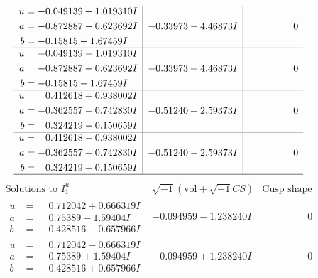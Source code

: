 \documentclass[1p]{elsarticle_modified}
\theoremstyle{definition}
\newcommand{\I}{\sqrt{-1}}
\begin{document}
$$\begin{array}{c|c|c}
\begin{aligned}
u &= -0.049139 + 1.019310 I \\
a &= -0.872887 - 0.623692 I \\
b &= -0.15815 + 1.67459 I\end{aligned}
 & -0.33973 - 4.46873 I & \phantom{-0.000000 } 0 \\ \hline\begin{aligned}
u &= -0.049139 - 1.019310 I \\
a &= -0.872887 + 0.623692 I \\
b &= -0.15815 - 1.67459 I\end{aligned}
 & -0.33973 + 4.46873 I & \phantom{-0.000000 } 0 \\ \hline\begin{aligned}
u &= \phantom{-}0.412618 + 0.938002 I \\
a &= -0.362557 - 0.742830 I \\
b &= \phantom{-}0.324219 - 0.150659 I\end{aligned}
 & -0.51240 + 2.59373 I & \phantom{-0.000000 } 0 \\ \hline\begin{aligned}
u &= \phantom{-}0.412618 - 0.938002 I \\
a &= -0.362557 + 0.742830 I \\
b &= \phantom{-}0.324219 + 0.150659 I\end{aligned}
 & -0.51240 - 2.59373 I & \phantom{-0.000000 } 0\\
 \hline 
 \end{array}$$\newpage$$\begin{array}{c|c|c}  
\text{Solutions to }I^u_{1}& \I (\text{vol} + \sqrt{-1}CS) & \text{Cusp shape}\\
 \hline 
\begin{aligned}
u &= \phantom{-}0.712042 + 0.666319 I \\
a &= \phantom{-}0.75389 - 1.59404 I \\
b &= \phantom{-}0.428516 - 0.657966 I\end{aligned}
 & -0.094959 - 1.238240 I & \phantom{-0.000000 } 0 \\ \hline\begin{aligned}
u &= \phantom{-}0.712042 - 0.666319 I \\
a &= \phantom{-}0.75389 + 1.59404 I \\
b &= \phantom{-}0.428516 + 0.657966 I\end{aligned}
 & -0.094959 + 1.238240 I & \phantom{-0.000000 } 0 \\ \hline\begin{aligned}

\end{aligned}
\end{array}$$
\end{document}
